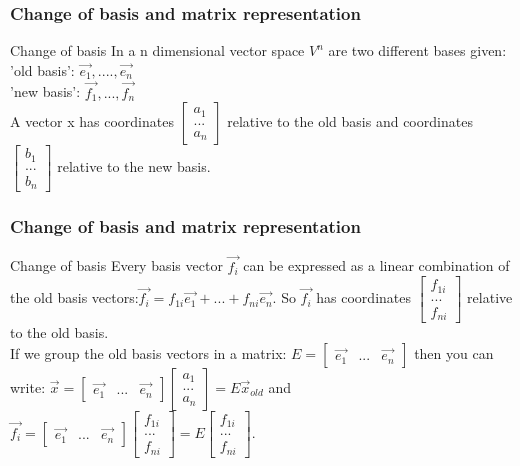 \begin{frame}
	\frametitle{Change of basis and matrix representation}
	\begin{block}{Change of basis}
		In a n dimensional vector space $V^n$ are two different bases given:\\
		'old basis': $\overrightarrow{e_1},....,\overrightarrow{e_n}$\\
		'new basis': $\overrightarrow{f_1},...,\overrightarrow{f_n}$\\
		A vector x has coordinates $\begin{bmatrix} a_1\\...\\a_n\end{bmatrix}$ relative to the old basis and coordinates $\begin{bmatrix} b_1\\...\\b_n\end{bmatrix}$ relative to the new basis.
	\end{block}
\end{frame}

\begin{frame}
	\frametitle{Change of basis and matrix representation}
	\begin{block}{Change of basis}
		Every basis vector $\overrightarrow{f_i}$ can be expressed as a linear combination of the old basis vectors:$\overrightarrow{f_i}=f_{1i}\overrightarrow{e_1}+...+f_{ni}\overrightarrow{e_n}$. So $\overrightarrow{f_i}$ has coordinates $\begin{bmatrix} f_{1i}\\...\\f_{ni}
		\end{bmatrix}$ relative to the old basis.\\
		If we group the old basis vectors in a matrix:
		$E=\begin{bmatrix} \overrightarrow{e_1} & ... & \overrightarrow{e_n} \end{bmatrix}$ then you can write: $\overrightarrow{x}=\begin{bmatrix} \overrightarrow{e_1} & ... & \overrightarrow{e_n} \end{bmatrix} \begin{bmatrix} a_1 \\ ... \\ a_n \end{bmatrix}=E\overrightarrow{x}_{old}$ and $\overrightarrow{f_i}=\begin{bmatrix} \overrightarrow{e_1} & ... & \overrightarrow{e_n} \end{bmatrix} \begin{bmatrix} f_{1i} \\ ... \\ f_{ni} \end{bmatrix}=E\begin{bmatrix} f_{1i} \\ ... \\ f_{ni} \end{bmatrix}$.
	\end{block}
\end{frame}

